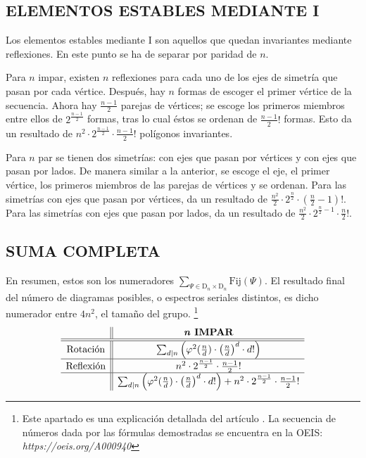 		\subsection{ELEMENTOS ESTABLES MEDIANTE I}
		
		Los elementos estables mediante I son aquellos que quedan invariantes mediante reflexiones. En este punto se ha de separar por paridad de $n$. 
		
		Para $n$ impar, existen $n$ reflexiones para cada uno de los ejes de simetría que pasan por cada vértice. Después, hay $n$ formas de escoger el primer vértice de la secuencia. Ahora hay $\frac{n-1}{2}$ parejas de vértices; se escoge los primeros miembros entre ellos de $2^{\frac{n-1}{2}}$ formas, tras lo cual éstos se ordenan de $\frac{n-1}{2}!$ formas. Esto da un resultado de  $n^2\cdot2^{\frac{n-1}{2}}\cdot\frac{n-1}{2}!$ polígonos invariantes.
		
		Para $n$ par se tienen dos simetrías: con ejes que pasan por vértices y con ejes que pasan por lados. De manera similar a la anterior, se escoge el eje, el primer vértice, los primeros miembros de las parejas de vértices y se ordenan. Para las simetrías con ejes que pasan por vértices, da un resultado de  $\frac{n^2}{2}\cdot2^{\frac{n}{2}}\cdot\left(\frac{n}{2}-1\right)!$. Para las simetrías con ejes que pasan por lados, da un resultado de $\frac{n^2}{2}\cdot2^{\frac{n}{2}-1}\cdot\frac{n}{2}!$.
		
		\subsection*{SUMA COMPLETA}
		
		En resumen, estos son los numeradores $\sum_{\Psi\in\text{D}_{n}\times\text{D}_{n}}\text{Fij}(\Psi)$. El resultado final del número de diagramas posibles, o espectros seriales distintos, es dicho numerador entre $4n^2$, el tamaño del grupo. \footnote{Este apartado es una explicación detallada del artículo \cite{polygons}. La secuencia de números dada por las fórmulas demostradas se encuentra en la OEIS: \textit{https://oeis.org/A000940}}		
		\def\arraystretch{1.25}
		$$\begin{array}{c||c}
		&\textbf{\textit{n} IMPAR}\\\hline\hline
		\text{Rotación}&\sum_{d|n}\left(\varphi^2(\frac{n}{d})\cdot\left(\frac{n}{d}\right)^d\cdot d!\right)\\\hline
		\text{Reflexión}&n^2\cdot2^{\frac{n-1}{2}}\cdot\frac{n-1}{2}!\\\hline
		&\sum_{d|n}\left(\varphi^2(\frac{n}{d})\cdot\left(\frac{n}{d}\right)^d\cdot d!\right)+n^2\cdot2^{\frac{n-1}{2}}\cdot\frac{n-1}{2}!\\
		\end{array}$$
		
